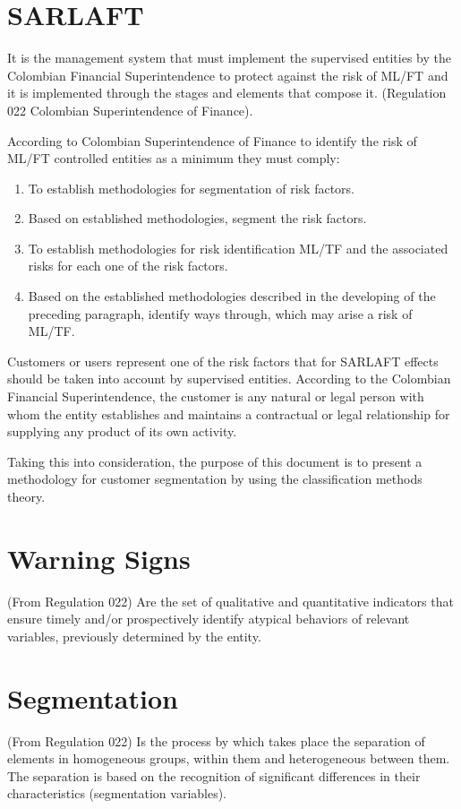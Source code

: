 \section{SARLAFT}
It is the management system that must implement the supervised entities by the Colombian Financial Superintendence to protect against the risk of ML/FT and it is implemented through the stages and elements that compose it. (Regulation 022 Colombian Superintendence of Finance).\par
According to Colombian Superintendence of Finance to identify the risk of ML/FT controlled entities as a minimum they must comply:
\begin{enumerate}
  \item To establish methodologies for segmentation of risk factors.
  \item Based on established methodologies, segment the risk factors.
  \item To establish methodologies for risk identification ML/TF and the associated risks for each one of the risk factors.
\item Based on the established methodologies described in the developing of the preceding paragraph, identify ways through, which may arise a risk of ML/TF.
\end{enumerate}
Customers or users represent one of the risk factors that for SARLAFT effects should be taken into account by supervised entities.
According to the Colombian Financial Superintendence, the customer is any natural or legal person with whom the entity establishes and maintains a contractual or legal relationship for supplying any product of its own activity.\par
Taking this into consideration, the purpose of this document is to present a methodology for customer segmentation by using the classification methods theory.

\section{Warning Signs} (From Regulation 022)
Are the set of qualitative and quantitative indicators that ensure timely and/or prospectively identify atypical behaviors of relevant variables, previously determined by the entity.
\section{Segmentation} (From Regulation 022)
Is the process by which takes place the separation of elements in homogeneous groups, within them and heterogeneous between them. The separation is based on the recognition of significant differences in their characteristics (segmentation variables).


